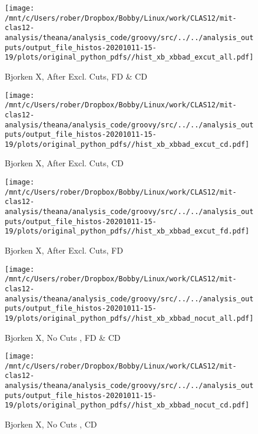 \documentclass{article}
\begin{document}
\begin{landscape}
    \begin{figure}[h]
        \centering

        \texttt{[image: /mnt/c/Users/rober/Dropbox/Bobby/Linux/work/CLAS12/mit-clas12-analysis/theana/analysis\_code/groovy/src/../../analysis\_outputs/output\_file\_histos-20201011-15-19/plots/original\_python\_pdfs//hist\_xb\_xbbad\_excut\_all.pdf]}
        \captionsetup{textformat=empty,labelformat=blank}
        \caption{Bjorken X, After Excl. Cuts, FD \& CD}
    \end{figure}
    \clearpage
    
    \begin{figure}[h]
        \centering

        \texttt{[image: /mnt/c/Users/rober/Dropbox/Bobby/Linux/work/CLAS12/mit-clas12-analysis/theana/analysis\_code/groovy/src/../../analysis\_outputs/output\_file\_histos-20201011-15-19/plots/original\_python\_pdfs//hist\_xb\_xbbad\_excut\_cd.pdf]}
        \captionsetup{textformat=empty,labelformat=blank}
        \caption{Bjorken X, After Excl. Cuts, CD}
    \end{figure}
    \clearpage
    
    \begin{figure}[h]
        \centering

        \texttt{[image: /mnt/c/Users/rober/Dropbox/Bobby/Linux/work/CLAS12/mit-clas12-analysis/theana/analysis\_code/groovy/src/../../analysis\_outputs/output\_file\_histos-20201011-15-19/plots/original\_python\_pdfs//hist\_xb\_xbbad\_excut\_fd.pdf]}
        \captionsetup{textformat=empty,labelformat=blank}
        \caption{Bjorken X, After Excl. Cuts, FD}
    \end{figure}
    \clearpage
    
    \begin{figure}[h]
        \centering

        \texttt{[image: /mnt/c/Users/rober/Dropbox/Bobby/Linux/work/CLAS12/mit-clas12-analysis/theana/analysis\_code/groovy/src/../../analysis\_outputs/output\_file\_histos-20201011-15-19/plots/original\_python\_pdfs//hist\_xb\_xbbad\_nocut\_all.pdf]}
        \captionsetup{textformat=empty,labelformat=blank}
        \caption{Bjorken X, No Cuts , FD \& CD}
    \end{figure}
    \clearpage
    
    \begin{figure}[h]
        \centering

        \texttt{[image: /mnt/c/Users/rober/Dropbox/Bobby/Linux/work/CLAS12/mit-clas12-analysis/theana/analysis\_code/groovy/src/../../analysis\_outputs/output\_file\_histos-20201011-15-19/plots/original\_python\_pdfs//hist\_xb\_xbbad\_nocut\_cd.pdf]}
        \captionsetup{textformat=empty,labelformat=blank}
        \caption{Bjorken X, No Cuts , CD}
    \end{figure}
    \clearpage
    

\end{landscape}
\end{document}
